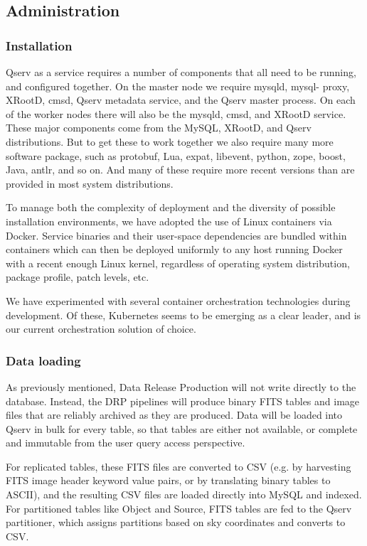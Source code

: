 \documentclass[DM,lsstdraft,toc]{lsstdoc}
\begin{document}
\subsection{Administration}\label{administration}

\subsubsection{Installation}\label{installation}

Qserv as a service requires a number of components that all need to be
running, and configured together. On the master node we require mysqld, mysql-
proxy, XRootD, cmsd, Qserv metadata service, and the Qserv master process. On
each of the worker nodes there will also be the mysqld, cmsd, and XRootD
service. These major components come from the MySQL, XRootD, and Qserv
distributions. But to get these to work together we also require many more
software package, such as protobuf, Lua, expat, libevent, python, zope, boost,
Java, antlr, and so on. And many of these require more recent versions than
are provided in most system distributions.

To manage both the complexity of deployment and the diversity of possible
installation environments, we have adopted the use of Linux containers via
Docker.  Service binaries and their user-space dependencies are bundled within
containers which can then be deployed uniformly to any host running Docker
with a recent enough Linux kernel, regardless of operating system
distribution, package profile, patch levels, etc.

We have experimented with several container orchestration technologies
during development.  Of these, Kubernetes seems to be emerging as a clear
leader, and is our current orchestration solution of choice.

\subsubsection{Data loading}\label{data-loading}

As previously mentioned, Data Release Production will not write directly
to the database. Instead, the DRP pipelines will produce binary FITS
tables and image files that are reliably archived as they are produced.
Data will be loaded into Qserv in bulk for every table, so that tables
are either not available, or complete and immutable from the user query
access perspective.

For replicated tables, these FITS files are converted to CSV (e.g. by
harvesting FITS image header keyword value pairs, or by translating
binary tables to ASCII), and the resulting CSV files are loaded directly
into MySQL and indexed. For partitioned tables like Object and Source,
FITS tables are fed to the Qserv partitioner, which assigns partitions
based on sky coordinates and converts to CSV.
\end{document}
